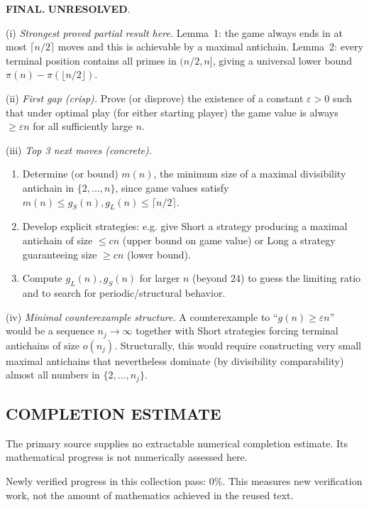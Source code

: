 \medskip
\noindent\textbf{FINAL.} \textbf{UNRESOLVED}.

\noindent(i) \emph{Strongest proved partial result here.}
Lemma~1: the game always ends in at most $\lceil n/2\rceil$ moves and this is achievable by a maximal antichain.
Lemma~2: every terminal position contains all primes in $(n/2,n]$, giving a universal lower bound $\pi(n)-\pi(\lfloor n/2\rfloor)$.

\noindent(ii) \emph{First gap (crisp).}
Prove (or disprove) the existence of a constant $\varepsilon>0$ such that under optimal play (for either starting player) the game value is always $\ge \varepsilon n$ for all sufficiently large $n$.

\noindent(iii) \emph{Top 3 next moves (concrete).}
\begin{enumerate}
\item Determine (or bound) $m(n)$, the minimum size of a maximal divisibility antichain in $\{2,\dots,n\}$, since game values satisfy $m(n)\le g_S(n),g_L(n)\le \lceil n/2\rceil$.
\item Develop explicit strategies: e.g. give Short a strategy producing a maximal antichain of size $\le cn$ (upper bound on game value) or Long a strategy guaranteeing size $\ge cn$ (lower bound).
\item Compute $g_L(n),g_S(n)$ for larger $n$ (beyond $24$) to guess the limiting ratio and to search for periodic/structural behavior.
\end{enumerate}

\noindent(iv) \emph{Minimal counterexample structure.}
A counterexample to ``$g(n)\ge \varepsilon n$'' would be a sequence $n_j\to\infty$ together with Short strategies forcing terminal antichains of size $o(n_j)$. Structurally, this would require constructing very small maximal antichains that nevertheless dominate (by divisibility comparability) almost all numbers in $\{2,\dots,n_j\}$.




\subsection*{COMPLETION ESTIMATE}
The primary source supplies no extractable numerical completion estimate. Its mathematical progress is not numerically assessed here.

Newly verified progress in this collection pass: $0\%$. This measures new verification work, not the amount of mathematics achieved in the reused text.
